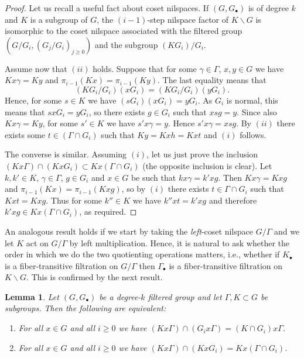 \documentclass[a4paper,12pt,reqno]{amsart}
\newtheorem{lemma}[theorem]{Lemma}
\theoremstyle{definition}
\begin{document}
\begin{proof}
Let us recall a useful fact about coset nilspaces. If $(G,G_\bullet)$ is of degree $k$ and $K$ is a subgroup of $G$, the $(i-1)$-step nilspace factor of $K\backslash G$ is isomorphic to the coset nilspace associated with the filtered group $(G/G_i,(G_j/G_i)_{j\ge 0})$ and the subgroup $(K G_i)/G_i$.

Assume now that $(ii)$ holds. Suppose that for some $\gamma\in \Gamma$, $x,y\in G$ we have $Kx\gamma=Ky$ and $\pi_{i-1}(Kx)=\pi_{i-1}(Ky)$. The last equality means that 
\[
(K G_i/G_i) (xG_i) = (K G_i/G_i) (y G_i).
\]
Hence, for some $s\in K$ we have $(sG_i)(xG_i)=yG_i$. As $G_i$ is normal, this means that $sxG_i = yG_i$, so there exists $g\in G_i$ such that $xsg=y$. Since also $Kx\gamma=Ky$, for some $s'\in K$ we have $s'x\gamma=y$. Hence $s'x\gamma=xsg$. By $(ii)$ there exists some $t\in (\Gamma\cap G_i)$ such that $Ky=Kxh=K x t$ and $(i)$ follows.

The converse is similar. Assuming $(i)$, let us just prove the inclusion $(Kx \Gamma)\cap(KxG_i)\subset K x(\Gamma\cap G_i)$ (the opposite inclusion is clear). Let $k,k'\in K$, $\gamma\in \Gamma$, $g\in G_i$ and $x\in G$ be such that $kx\gamma = k'x g$. Then  $Kx \gamma = Kx g$ and $\pi_{i-1}(Kx)=\pi_{i-1}(Kxg)$, so by $(i)$ there exists $t\in \Gamma\cap G_i$ such that $Kxt=Kxg$. Thus for some $k''\in K$ we have $k''xt = k'xg$ and therefore $k'xg\in K x (\Gamma\cap G_i)$, as required.
\end{proof}
\noindent An analogous result holds if we start by taking the \emph{left}-coset nilspace $G/\Gamma$ and we let $K$ act on $G/\Gamma$ by left multiplication. Hence, it is natural to ask whether the order in which we do the two quotienting operations matters, i.e., whether  if $K_\bullet$ is a fiber-transitive filtration on $G/\Gamma$ then $\Gamma_\bullet$ is a fiber-transitive filtration on $K\backslash G$. This is confirmed by the next result.

\begin{lemma}\label{lem:sym-nil-pair}
Let $(G,G_\bullet)$ be a degree-$k$ filtered group and let ${\Gamma},K\subset G$ be subgroups. Then the following are equivalent:
\begin{enumerate}
    \item For all $x\in G$ and all $i\ge 0$ we have $(Kx{\Gamma})\cap(G_ix{\Gamma})=(K\cap G_i)x{\Gamma}$.
    \item For all $x\in G$ and all $i\ge 0$ we have $(Kx{\Gamma})\cap(KxG_i)=Kx({\Gamma}\cap G_i)$.
\end{enumerate}
\end{lemma}
\end{document}
